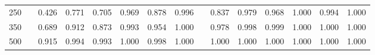 % 
\begin{tabular}{ccccccccccccccc}
  \hline
  \hline
250 &  & 0.426 & 0.771 & 0.705 & 0.969 & 0.878 & 0.996 &  & 0.837 & 0.979 & 0.968 & 1.000 & 0.994 & 1.000 \\ 
  350 &  & 0.689 & 0.912 & 0.873 & 0.993 & 0.954 & 1.000 &  & 0.978 & 0.998 & 0.999 & 1.000 & 1.000 & 1.000 \\ 
  500 &  & 0.915 & 0.994 & 0.993 & 1.000 & 0.998 & 1.000 &  & 1.000 & 1.000 & 1.000 & 1.000 & 1.000 & 1.000 \\ 
   \hline
\end{tabular}
